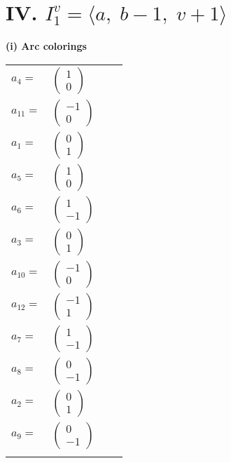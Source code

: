 \documentclass[1p]{elsarticle_modified}
\theoremstyle{definition}
\begin{document}
\centering \section*{IV. $I^v_{1}= \langle a,\;b-1,\;v+1 \rangle$}
\flushleft \textbf{(i) Arc colorings}\\
\begin{tabular}{m{7pt} m{180pt} m{7pt} m{180pt} }
\flushright $a_{4}=$&$\begin{pmatrix}1\\0\end{pmatrix}$ \\
\flushright $a_{11}=$&$\begin{pmatrix}-1\\0\end{pmatrix}$ \\
\flushright $a_{1}=$&$\begin{pmatrix}0\\1\end{pmatrix}$ \\
\flushright $a_{5}=$&$\begin{pmatrix}1\\0\end{pmatrix}$ \\
\flushright $a_{6}=$&$\begin{pmatrix}1\\-1\end{pmatrix}$ \\
\flushright $a_{3}=$&$\begin{pmatrix}0\\1\end{pmatrix}$ \\
\flushright $a_{10}=$&$\begin{pmatrix}-1\\0\end{pmatrix}$ \\
\flushright $a_{12}=$&$\begin{pmatrix}-1\\1\end{pmatrix}$ \\
\flushright $a_{7}=$&$\begin{pmatrix}1\\-1\end{pmatrix}$ \\
\flushright $a_{8}=$&$\begin{pmatrix}0\\-1\end{pmatrix}$ \\
\flushright $a_{2}=$&$\begin{pmatrix}0\\1\end{pmatrix}$ \\
\flushright $a_{9}=$&$\begin{pmatrix}0\\-1\end{pmatrix}$\\&\end{tabular}
\end{document}
